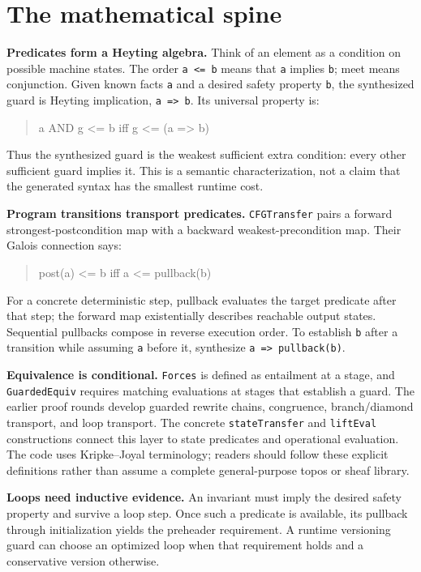 \documentclass[11pt]{article}
\begin{document}
\section*{The mathematical spine}

\textbf{Predicates form a Heyting algebra.} Think of an element as a condition on possible machine states. The order \texttt{a <= b} means that \texttt{a} implies \texttt{b}; meet means conjunction. Given known facts \texttt{a} and a desired safety property \texttt{b}, the synthesized guard is Heyting implication, \texttt{a => b}. Its universal property is:

\begin{quote}\small\ttfamily a AND g <= b    iff    g <= (a => b)\end{quote}

Thus the synthesized guard is the weakest sufficient extra condition: every other sufficient guard implies it. This is a semantic characterization, not a claim that the generated syntax has the smallest runtime cost.

\textbf{Program transitions transport predicates.} \texttt{CFGTransfer} pairs a forward strongest-postcondition map with a backward weakest-precondition map. Their Galois connection says:

\begin{quote}\small\ttfamily post(a) <= b    iff    a <= pullback(b)\end{quote}

For a concrete deterministic step, pullback evaluates the target predicate after that step; the forward map existentially describes reachable output states. Sequential pullbacks compose in reverse execution order. To establish \texttt{b} after a transition while assuming \texttt{a} before it, synthesize \texttt{a => pullback(b)}.

\textbf{Equivalence is conditional.} \texttt{Forces} is defined as entailment at a stage, and \texttt{GuardedEquiv} requires matching evaluations at stages that establish a guard. The earlier proof rounds develop guarded rewrite chains, congruence, branch/diamond transport, and loop transport. The concrete \texttt{stateTransfer} and \texttt{liftEval} constructions connect this layer to state predicates and operational evaluation. The code uses Kripke--Joyal terminology; readers should follow these explicit definitions rather than assume a complete general-purpose topos or sheaf library.

\textbf{Loops need inductive evidence.} An invariant must imply the desired safety property and survive a loop step. Once such a predicate is available, its pullback through initialization yields the preheader requirement. A runtime versioning guard can choose an optimized loop when that requirement holds and a conservative version otherwise.
\end{document}
